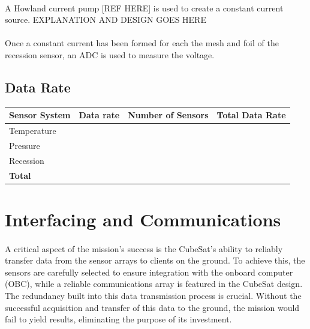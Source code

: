\documentclass[11pt]{article}
\begin{document}
	\paragraph{}A Howland current pump [REF HERE] is used to create a constant current source. EXPLANATION AND DESIGN GOES HERE
	
	\paragraph{}Once a constant current has been formed for each the mesh and foil of the recession sensor, an ADC is used to measure the voltage.
	
	\subsection{Data Rate}
	
	\begin{center}
		\begin{tabular}{|p{3.5cm}|p{3.5cm}|p{4cm}|p{3.5cm}|}
			\hline
			\bf{Sensor System} & \bf{Data rate} & \bf{Number of Sensors} & \bf{Total Data Rate}\\ \hline
			Temperature &   & &\\ \hline
			Pressure &  &  & \\ \hline
			Recession &  &  & \\ \hline
			\bf{Total} &  &  & \\ \hline
		\end{tabular}
	\end{center}
	
	
	\section{Interfacing and Communications}
	
	\paragraph{} A critical aspect of the mission's success is the CubeSat's ability to reliably transfer data from the sensor arrays to clients on the ground. To achieve this, the sensors are carefully selected to ensure integration with the onboard computer (OBC), while a reliable communications array is featured in the CubeSat design. The redundancy built into this data transmission process is crucial. Without the successful acquisition and transfer of this data to the ground, the mission would fail to yield results, eliminating the purpose of its investment.
	
\end{document}
